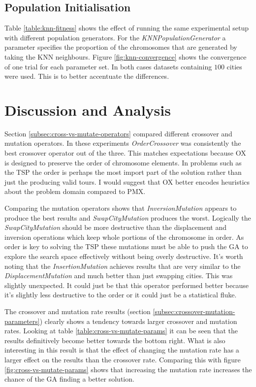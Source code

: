 \documentclass[journal]{IEEEtran}
\begin{document}
\subsection{Population Initialisation}
Table \ref{table:knn-fitness} shows the effect of running the same experimental setup with different population generators. For the \textit{KNNPopulationGenerator} a parameter specifies the proportion of the chromosomes that are generated by taking the KNN neighbours. Figure \ref{fig:knn-convergence} shows the convergence of one trial for each parameter set. In both cases datasets containing $100$ cities were used. This is to better accentuate the differences.

\section{Discussion and Analysis}
Section \ref{subsec:cross-vs-mutate-operators} compared different crossover and mutation operators. In these experiments \textit{OrderCrossover} was consistently the best crossover operator out of the three. This matches expectations because OX is designed to preserve the order of chromosome elements. In problems such as the TSP the order is perhaps the most import part of the solution rather than just the producing valid tours. I would suggest that OX better encodes heuristics about the problem domain compared to PMX.

Comparing the mutation operators shows that \textit{InversionMutation} appears to produce the best results and \textit{SwapCityMutation} produces the worst. Logically the \textit{SwapCityMutation} should be more destructive than the displacement and inversion operations which keep whole portions of the chromosome in order. As order is key to solving the TSP these mutations must be able to push the GA to explore the search space effectively without being overly destructive. It's worth noting that the \textit{InsertionMutation} achieves results that are very similar to the \textit{DisplacementMutation} and much better than just swapping cities. This was slightly unexpected. It could just be that this operator performed better because it's slightly less destructive to the order or it could just be a statistical fluke.

The crossover and mutation rate results (section \ref{subsec:crossover-mutation-parameters}) clearly shows a tendency towards larger crossover and mutation rates. Looking at table \ref{table:cross-vs-mutate-params} it can be seen that the results definitively become better towards the bottom right. What is also interesting in this result is that the effect of changing the mutation rate has a larger effect on the results than the crossover rate. Comparing this with figure \ref{fig:cross-vs-mutate-params} shows that increasing the mutation rate increases the chance of the GA finding a better solution. 
\end{document}

